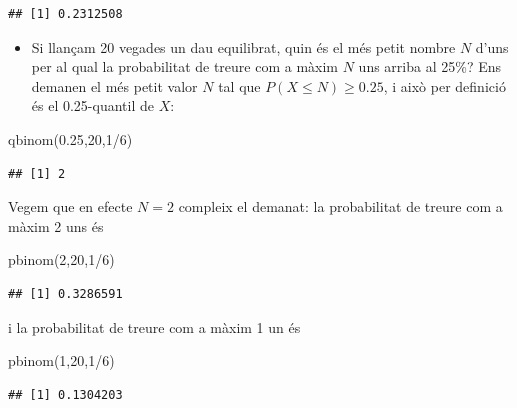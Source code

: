 \documentclass[
]{book}
\newenvironment{Shaded}{\begin{snugshade}}{\end{snugshade}}
\newcommand{\DecValTok}[1]{\textcolor[rgb]{0.00,0.00,0.81}{#1}}
\newcommand{\FloatTok}[1]{\textcolor[rgb]{0.00,0.00,0.81}{#1}}
\newcommand{\FunctionTok}[1]{\textcolor[rgb]{0.00,0.00,0.00}{#1}}
\newcommand{\NormalTok}[1]{#1}
\newcommand{\SpecialCharTok}[1]{\textcolor[rgb]{0.00,0.00,0.00}{#1}}
\providecommand{\tightlist}{%
  \setlength{\itemsep}{0pt}\setlength{\parskip}{0pt}}
\renewcommand{\leq}{\leqslant}
\renewcommand{\geq}{\geqslant}
\theoremstyle{definition}
\theoremstyle{definition}
\theoremstyle{definition}
\theoremstyle{remark}
\begin{document}
\begin{verbatim}
## [1] 0.2312508
\end{verbatim}

\begin{itemize}
\tightlist
\item
  Si llançam 20 vegades un dau equilibrat, quin és el més petit nombre \(N\) d'uns per al qual la probabilitat de treure com a màxim \(N\) uns arriba al 25\%? Ens demanen el més petit valor \(N\) tal que \(P(X\leq N)\geq 0.25\), i això per definició és el 0.25-quantil de \(X\):
\end{itemize}

\begin{Shaded}
\begin{Highlighting}[]
\FunctionTok{qbinom}\NormalTok{(}\FloatTok{0.25}\NormalTok{,}\DecValTok{20}\NormalTok{,}\DecValTok{1}\SpecialCharTok{/}\DecValTok{6}\NormalTok{)}
\end{Highlighting}
\end{Shaded}

\begin{verbatim}
## [1] 2
\end{verbatim}

Vegem que en efecte \(N=2\) compleix el demanat: la probabilitat de treure com a màxim 2 uns és

\begin{Shaded}
\begin{Highlighting}[]
\FunctionTok{pbinom}\NormalTok{(}\DecValTok{2}\NormalTok{,}\DecValTok{20}\NormalTok{,}\DecValTok{1}\SpecialCharTok{/}\DecValTok{6}\NormalTok{)}
\end{Highlighting}
\end{Shaded}

\begin{verbatim}
## [1] 0.3286591
\end{verbatim}

i la probabilitat de treure com a màxim 1 un és

\begin{Shaded}
\begin{Highlighting}[]
\FunctionTok{pbinom}\NormalTok{(}\DecValTok{1}\NormalTok{,}\DecValTok{20}\NormalTok{,}\DecValTok{1}\SpecialCharTok{/}\DecValTok{6}\NormalTok{)}
\end{Highlighting}
\end{Shaded}

\begin{verbatim}
## [1] 0.1304203
\end{verbatim}
\end{document}
